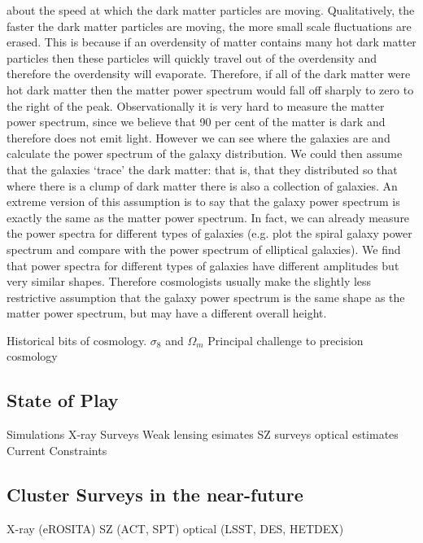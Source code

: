about the speed at which the dark matter particles are moving. Qualitatively, the faster the dark matter
particles are moving, the more small scale fluctuations are erased. This is because if an overdensity of
matter contains many hot dark matter particles then these particles will quickly travel out of the overdensity
and therefore the overdensity will evaporate. Therefore, if all of the dark matter were hot dark matter then
the matter power spectrum would fall off sharply to zero to the right of the peak.
Observationally it is very hard to measure the matter power spectrum, since we believe that 90 per cent of
the matter is dark and therefore does not emit light. However we can see where the galaxies are and 
calculate the power spectrum of the galaxy distribution. We could then assume that the galaxies ‘trace’ the
dark matter: that is, that they distributed so that where there is a clump of dark matter there is also a
collection of galaxies. An extreme version of this assumption is to say that the galaxy power spectrum is
exactly the same as the matter power spectrum. In fact, we can already measure the power spectra for
different types of galaxies (e.g. plot the spiral galaxy power spectrum and compare with the power
spectrum of elliptical galaxies). We find that power spectra for different types of galaxies have different
amplitudes but very similar shapes. Therefore cosmologists usually make the slightly less restrictive
assumption that the galaxy power spectrum is the same shape as the matter power spectrum, but may
have a different overall height. 



Historical bits of cosmology.
$\sigma_8$ and $\Omega_m$
Principal challenge to precision cosmology

\subsection{State of Play}
Simulations
X-ray Surveys
Weak lensing esimates
SZ surveys
optical estimates
Current Constraints

\subsection{Cluster Surveys in the near-future}
X-ray (eROSITA)
SZ (ACT, SPT)
optical (LSST, DES, HETDEX)